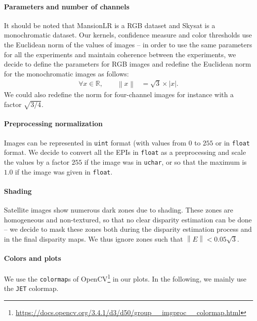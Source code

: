 \documentclass{article}
\newcommand{\abs} [1] {\left| #1 \right|}
\newcommand{\norm}[1]{\left\lVert#1\right\rVert}
\def\R{\mathbb{R}}
\theoremstyle{definition}
\begin{document}
\paragraph{Parameters and number of channels} It should be noted that MansionLR is a RGB dataset and Skysat is a monochromatic dataset. Our kernels, confidence measure and color thresholds use the Euclidean norm of the values of images -- in order to use the same parameters for all the experiments and maintain coherence between the experiments, we decide to define the parameters for RGB images and redefine the Euclidean norm for the monochromatic images as follows:
\begin{align}
 \forall x \in \R, \qquad \norm{x} &= \sqrt{3} \times \abs{x}.
\end{align}
We could also redefine the norm for four-channel images for instance with a factor $\sqrt{3/4}$.


\paragraph{Preprocessing normalization} Images can be represented in \verb#uint# format (with values from $0$ to $255$ or in \verb#float# format. We decide to convert all the EPIs in \verb#float# as a preprocessing and scale the values by a factor $255$ if the image was in \verb#uchar#, or so that the maximum is $1.0$ if the image was given in \verb#float#. 


\paragraph{Shading} Satellite images show numerous dark zones due to shading. These zones are homogeneous and non-textured, so that no clear disparity estimation can be done -- we decide to mask these zones both during the disparity estimation process and in the final disparity maps. We thus ignore zones such that $\norm{E} < 0.05 \sqrt{3}$.


\paragraph{Colors and plots} We use the \verb#colormap#s of OpenCV\footnote{\url{https://docs.opencv.org/3.4.1/d3/d50/group__imgproc__colormap.html}} in our plots. In the following, we mainly use the \verb#JET# colormap.%
\end{document}
